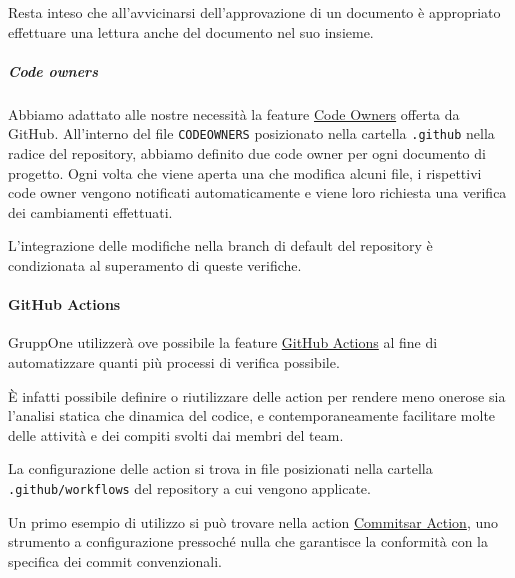 \documentclass[../../norme-di-progetto.tex]{subfiles}
\begin{document}
Resta inteso che all'avvicinarsi dell'approvazione di un documento è appropriato effettuare una lettura anche del documento nel suo insieme.


\subparagraph{Code owners}%
\label{subp:code_owners}

Abbiamo adattato alle nostre necessità la feature \href{https://help.github.com/en/github/creating-cloning-and-archiving-repositories/about-code-owners}{Code Owners} offerta da GitHub.
All'interno del file \verb|CODEOWNERS| posizionato nella cartella \verb|.github| nella radice del repository, abbiamo definito due code owner per ogni documento di progetto.
Ogni volta che viene aperta una  che modifica alcuni file, i rispettivi code owner vengono notificati automaticamente e viene loro richiesta una verifica dei cambiamenti effettuati.

L'integrazione delle modifiche nella branch di default del repository è condizionata al superamento di queste verifiche.

\paragraph{GitHub Actions}%
\label{par:github_actions}

GruppOne utilizzerà ove possibile la feature \href{https://help.github.com/en/actions/automating-your-workflow-with-github-actions/about-github-actions}{GitHub Actions} al fine di automatizzare quanti più processi di verifica possibile.

È infatti possibile definire o riutilizzare delle action per rendere meno onerose sia l'analisi statica che dinamica del codice, e contemporaneamente facilitare molte delle attività e dei compiti svolti dai membri del team.

La configurazione delle action si trova in file  posizionati nella cartella \verb|.github/workflows| del repository a cui vengono applicate.

Un primo esempio di utilizzo si può trovare nella action \href{https://github.com/marketplace/actions/commitsar-action}{Commitsar Action}, uno strumento a configurazione pressoché nulla che garantisce la conformità con la specifica dei commit convenzionali.


\end{document}
